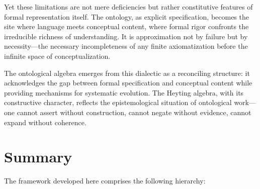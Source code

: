 \documentclass[12pt,a4paper]{article}
\newcommand{\domain}{\mathcal{D}}
\newcommand{\interp}{\mathcal{I}}
\newcommand{\concept}{\mathcal{C}}
\newcommand{\onto}{\mathcal{O}}
\newcommand{\intrel}{\mathfrak{R}}
\newcommand{\pfin}{\mathcal{P}_{\mathrm{fin}}}
\newcommand{\sem}[1]{\llbracket #1 \rrbracket}
\begin{document}
Yet these limitations are not mere deficiencies but rather constitutive features of formal representation itself. The ontology, as explicit specification, becomes the site where language meets conceptual content, where formal rigor confronts the irreducible richness of understanding. It is approximation not by failure but by necessity---the necessary incompleteness of any finite axiomatization before the infinite space of conceptualization.

The ontological algebra emerges from this dialectic as a reconciling structure: it acknowledges the gap between formal specification and conceptual content while providing mechanisms for systematic evolution. The Heyting algebra, with its constructive character, reflects the epistemological situation of ontological work---one cannot assert without construction, cannot negate without evidence, cannot expand without coherence.

\section{Summary}

The framework developed here comprises the following hierarchy:

\begin{center}
\end{center}
\end{document}
